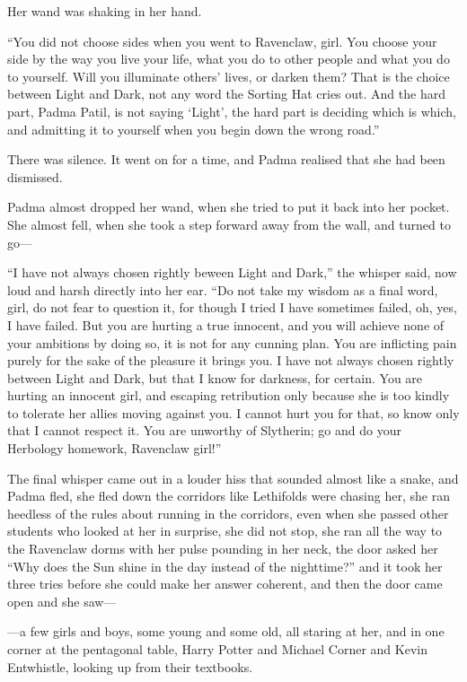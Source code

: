 Her wand was shaking in her hand.

``You did not choose sides when you went to Ravenclaw, girl. You choose
your side by the way you live your life, what you do to other people and
what you do to yourself. Will you illuminate others' lives, or darken
them? That is the choice between Light and Dark, not any word the
Sorting Hat cries out. And the hard part, Padma Patil, is not saying
`Light', the hard part is deciding which is which, and admitting it to
yourself when you begin down the wrong road.''

There was silence. It went on for a time, and Padma realised that she
had been dismissed.

Padma almost dropped her wand, when she tried to put it back into her
pocket. She almost fell, when she took a step forward away from the
wall, and turned to go---

``I have not always chosen rightly beween Light and Dark,'' the whisper
said, now loud and harsh directly into her ear. ``Do not take my wisdom
as a final word, girl, do not fear to question it, for though I tried I
have sometimes failed, oh, yes, I have failed. But you are hurting a
true innocent, and you will achieve none of your ambitions by doing so,
it is not for any cunning plan. You are inflicting pain purely for the
sake of the pleasure it brings you. I have not always chosen rightly
between Light and Dark, but that I know for darkness, for certain. You
are hurting an innocent girl, and escaping retribution only because she
is too kindly to tolerate her allies moving against you. I cannot hurt
you for that, so know only that I cannot respect it. You are unworthy of
Slytherin; go and do your Herbology homework, Ravenclaw girl!''

The final whisper came out in a louder hiss that sounded almost like a
snake, and Padma fled, she fled down the corridors like Lethifolds were
chasing her, she ran heedless of the rules about running in the
corridors, even when she passed other students who looked at her in
surprise, she did not stop, she ran all the way to the Ravenclaw dorms
with her pulse pounding in her neck, the door asked her ``Why does the
Sun shine in the day instead of the nighttime?'' and it took her three
tries before she could make her answer coherent, and then the door came
open and she saw---

---a few girls and boys, some young and some old, all staring at her,
and in one corner at the pentagonal table, Harry Potter and Michael
Corner and Kevin Entwhistle, looking up from their textbooks.

